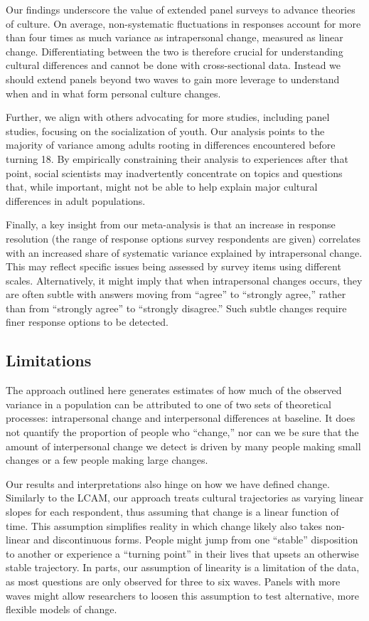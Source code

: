 \documentclass[
  12pt,
]{article}
\begin{document}
Our findings underscore the value of extended panel surveys to advance
theories of culture. On average, non-systematic fluctuations in
responses account for more than four times as much variance as
intrapersonal change, measured as linear change. Differentiating between
the two is therefore crucial for understanding cultural differences and
cannot be done with cross-sectional data. Instead we should extend
panels beyond two waves to gain more leverage to understand when and in
what form personal culture changes.

Further, we align with others advocating for more studies, including
panel studies, focusing on the socialization of youth. Our analysis
points to the majority of variance among adults rooting in differences
encountered before turning 18. By empirically constraining their
analysis to experiences after that point, social scientists may
inadvertently concentrate on topics and questions that, while important,
might not be able to help explain major cultural differences in adult
populations.

Finally, a key insight from our meta-analysis is that an increase in
response resolution (the range of response options survey respondents
are given) correlates with an increased share of systematic variance
explained by intrapersonal change. This may reflect specific issues
being assessed by survey items using different scales. Alternatively, it
might imply that when intrapersonal changes occurs, they are often
subtle with answers moving from ``agree'' to ``strongly agree,'' rather
than from ``strongly agree'' to ``strongly disagree.'' Such subtle
changes require finer response options to be detected.

\hypertarget{limitations}{%
\subsection{Limitations}\label{limitations}}

The approach outlined here generates estimates of how much of the
observed variance in a population can be attributed to one of two sets
of theoretical processes: intrapersonal change and interpersonal
differences at baseline. It does not quantify the proportion of people
who ``change,'' nor can we be sure that the amount of interpersonal
change we detect is driven by many people making small changes or a few
people making large changes.

Our results and interpretations also hinge on how we have defined
change. Similarly to the LCAM, our approach treats cultural trajectories
as varying linear slopes for each respondent, thus assuming that change
is a linear function of time. This assumption simplifies reality in
which change likely also takes non-linear and discontinuous forms.
People might jump from one ``stable'' disposition to another or
experience a ``turning point'' in their lives that upsets an otherwise
stable trajectory. In parts, our assumption of linearity is a limitation
of the data, as most questions are only observed for three to six waves.
Panels with more waves might allow researchers to loosen this assumption
to test alternative, more flexible models of change.
\end{document}
